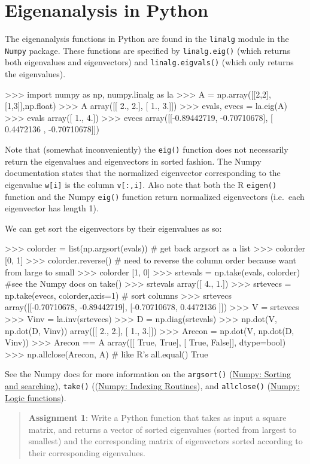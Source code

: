 
\section{Eigenanalysis in Python}

The eigenanalysis functions in Python are found in the
\lstinline!linalg! module in the \lstinline!Numpy! package. These
functions are specified by \lstinline!linalg.eig()! (which returns both
eigenvalues and eigenvectors) and \lstinline!linalg.eigvals()! (which
only returns the eigenvalues).

\begin{python}
>>> import numpy as np, numpy.linalg as la
>>> A = np.array([[2,2],[1,3]],np.float)
>>> A
array([[ 2.,  2.],
       [ 1.,  3.]])
>>> evals, evecs = la.eig(A)
>>> evals
array([ 1.,  4.])
>>> evecs
array([[-0.89442719, -0.70710678],
       [ 0.4472136 , -0.70710678]])
\end{python}
Note that (somewhat inconveniently) the \lstinline!eig()! function does
not necessarily return the eigenvalues and eigenvectors in sorted
fashion. The Numpy documentation states that the normalized eigenvector
corresponding to the eigenvalue \lstinline!w[i]! is the column
\lstinline!v[:,i]!. Also note that both the R \lstinline!eigen()!
function and the Numpy \lstinline!eig()! function return normalized
eigenvectors (i.e.~each eigenvector has length 1).

We can get sort the eigenvectors by their eigenvalues as so:

\begin{python}
>>> colorder = list(np.argsort(evals)) # get back argsort as a list
>>> colorder
[0, 1]
>>> colorder.reverse() # need to reverse the column order because want from large to small
>>> colorder
[1, 0]
>>> srtevals = np.take(evals, colorder) #see the Numpy docs on take()
>>> srtevals
array([ 4.,  1.])
>>> srtevecs = np.take(evecs, colorder,axis=1) # sort columns
>>> srtevecs
array([[-0.70710678, -0.89442719],
       [-0.70710678,  0.4472136 ]])
>>> V = srtevecs
>>> Vinv = la.inv(srtevecs)
>>> D = np.diag(srtevals)
>>> np.dot(V, np.dot(D, Vinv))
array([[ 2.,  2.],
       [ 1.,  3.]])
>>> Arecon = np.dot(V, np.dot(D, Vinv))
>>> Arecon == A
array([[ True,  True],
       [ True, False]], dtype=bool)
>>> np.allclose(Arecon, A)  # like R's all.equal()
True     
\end{python}
See the Numpy docs for more information on the \lstinline!argsort()!
(\href{http://docs.scipy.org/doc/numpy/reference/routines.sort.html}{Numpy:
Sorting and searching}), \lstinline!take()!
((\href{http://docs.scipy.org/doc/numpy/reference/routines.indexing.html}{Numpy:
Indexing Routines}), and \lstinline!allclose()!
(\href{http://docs.scipy.org/doc/numpy/reference/routines.logic.html}{Numpy:
Logic functions}).

\begin{quote}
\textbf{Assignment 1}: Write a Python function that takes as input a
square matrix, and returns a vector of sorted eigenvalues (sorted from
largest to smallest) and the corresponding matrix of eigenvectors sorted
according to their corresponding eigenvalues.

\end{quote}